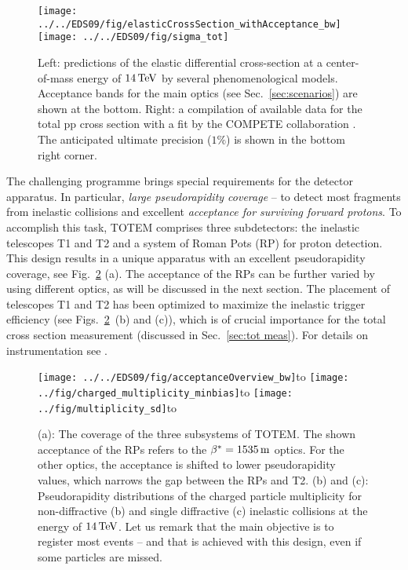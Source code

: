 \documentclass{cimento}
\def\be{\beta}
\def\un#1{\,{\rm #1}}
\def\subtitle#1#2{\vbox{\setbox0\hbox{#1}\copy0\hbox to\wd0{\hss#2\hss}}}
\begin{document}
\begin{figure}[htb]
\centerline{\hss
	\texttt{[image: ../../EDS09/fig/elasticCrossSection\_withAcceptance\_bw]}\hfil
	\texttt{[image: ../../EDS09/fig/sigma\_tot]}\hss
}%
\caption{Left: predictions of the elastic differential cross-section at a center-of-mass energy of $14\un{TeV}$ by several phenomenological models. Acceptance bands for the main optics (see Sec.~\ref{sec:scenarios}) are shown at the bottom. Right: a compilation of available data for the total pp cross section with a fit by the COMPETE collaboration \cite{cudell}. The anticipated ultimate precision ($1\%$) is shown in the bottom right corner.}%
\label{fig:why}%
\end{figure}

The challenging programme brings special requirements for the detector apparatus. In particular, {\em large pseudorapidity coverage} -- to detect most fragments from inelastic collisions and excellent {\em acceptance for surviving forward protons}. To accomplish this task, TOTEM comprises three subdetectors: the inelastic telescopes T1 and T2 and a system of Roman Pots (RP) for proton detection. This design results in a unique apparatus with an excellent pseudorapidity coverage, see Fig.~\ref{fig:acceptance} (a). The acceptance of the RPs can be further varied by using different optics, as will be discussed in the next section. The placement of telescopes T1 and T2 has been optimized to maximize the inelastic trigger efficiency (see Figs.~\ref{fig:acceptance}~(b) and (c)), which is of crucial importance for the total cross section measurement (discussed in Sec.~\ref{sec:tot meas}). For details on instrumentation see \cite{tdr, jinst}. 

\begin{figure}[htb]
\centerline{\hss
	\subtitle{\texttt{[image: ../../EDS09/fig/acceptanceOverview\_bw]}}{(a)}\hskip4mm\hfil
	\subtitle{\texttt{[image: ../fig/charged\_multiplicity\_minbias]}}{(b)}\hskip4mm\hfil
	\subtitle{\texttt{[image: ../fig/multiplicity\_sd]}}{(c)}\hss
}%
\caption{(a): The coverage of the three subsystems of TOTEM. The shown acceptance of the RPs refers to the $\be^*=1535\un{m}$ optics. For the other optics, the acceptance is shifted to lower pseudorapidity values, which narrows the gap between the RPs and T2.
(b) and (c): Pseudorapidity distributions of the charged particle multiplicity for non-diffractive (b) and single diffractive (c) inelastic collisions at the energy of $14\un{TeV}$. Let us remark that the main objective is to register most events -- and that is achieved with this design, even if some particles are missed.}%
\label{fig:acceptance}%
\end{figure}
\end{document}
